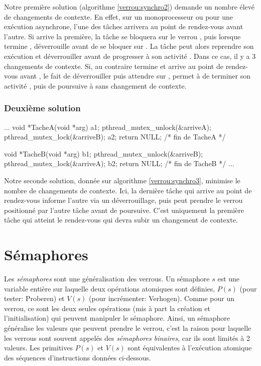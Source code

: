 Notre première solution (algorithme \ref{verrou:synchro2}) demande un nombre élevé de changements de contexte. En effet, sur un monoprocesseur ou pour une exécution asynchrone, l'une des tâches arrivera au point de rendez-vous avant l'autre. Si  arrive la première, la tâche se bloquera sur le verrou , puis lorsque  termine ,  déverrouille  avant de se bloquer sur . La tâche  peut alors reprendre son exécution et déverrouiller  avant de progresser à son activité . Dans ce cas, il y a 3 changements de contexte. Si, au contraire  termine  et arrive au point de rendez-vous avant , le fait de déverrouiller  puis attendre sur , permet à  de terminer son activité , puis de poursuive à  sans changement de contexte.

\subsubsection*{Deuxième solution}

\begin{codeblock}[label=verrou:synchro3,title=Deuxième solution: rendez-vous entre 2 tâches]
...
void *TacheA(void *arg) {
  a1;
  pthread_mutex_unlock(&arriveA);
  pthread_mutex_lock(&arriveB);
  a2;
  return NULL;
} /* fin de TacheA */

void *TacheB(void *arg) {
  b1;
  pthread_mutex_unlock(&arriveB);
  pthread_mutex_lock(&arriveA);
  b2;
  return NULL;
} /* fin de TacheB */
...
\end{codeblock}

Notre seconde solution, donnée sur algorithme \ref{verrou:synchro3}, minimise le nombre de changements de contexte. Ici, la dernière tâche qui arrive au point de rendez-vous informe l'autre via un déverrouillage, puis peut prendre le verrou positionné par l'autre tâche avant de poursuive. C'est uniquement la première tâche qui atteint le rendez-vous qui devra subir un changement de contexte.

\section{Sémaphores}
Les {\em sémaphores} sont une généralisation des verrous. Un sémaphore $s$ est une variable entière sur laquelle deux opérations atomiques sont définies, $P(s)$ (pour tester: Proberen) et $V(s)$ (pour incrémenter: Verhogen). Comme pour un verrou, ce sont les deux seules opérations (mis à part la création et l'initialisation) qui peuvent manipuler le sémaphore. Ainsi, un sémaphore généralise les valeurs que peuvent prendre le verrou, c'est la raison pour laquelle les verrous sont souvent appelés des {\em sémaphores binaires}, car ils sont limités à 2 valeurs.
Les primitives $P(s)$ et $V(s)$ sont équivalentes à l'exécution atomique des séquences d'instructions données ci-dessous.

